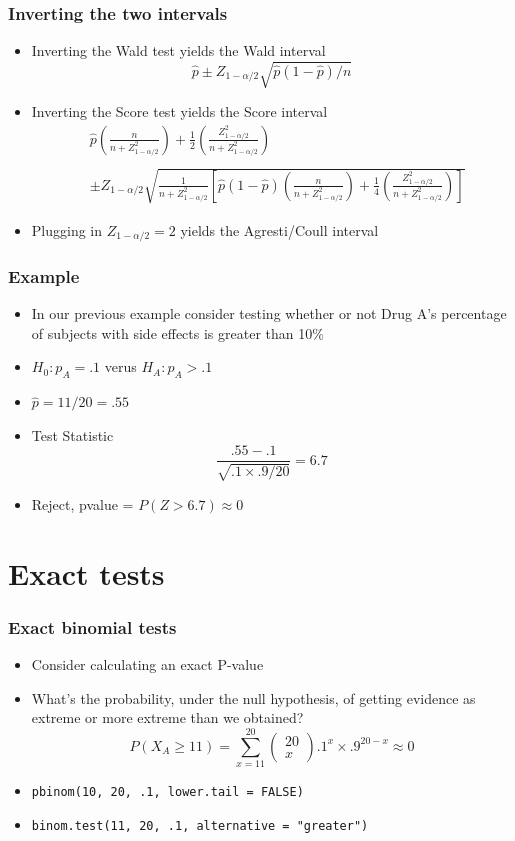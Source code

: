 \documentclass[aspectratio=169]{beamer}
\begin{document}
\begin{frame}\frametitle{Inverting the two intervals}
  \begin{itemize}
  \item Inverting the Wald test yields the Wald interval
    $$
    \hat p \pm Z_{1 - \alpha / 2} \sqrt{\hat p(1 - \hat p) / n}
    $$
  \item Inverting the Score test yields the Score interval
    \small
    \begin{eqnarray*}
      &  \hat p \left(\frac{n}{n + Z_{1 - \alpha / 2}^2}\right) + 
      \frac{1}{2} \left(\frac{Z_{1 - \alpha / 2}^2}{n + Z_{1 - \alpha / 2}^2}\right) \\\\ 
      &  \pm Z_{1 - \alpha/2}\sqrt{\frac{1}{n + Z_{1 - \alpha / 2}^2} 
        \left[\hat p (1 - \hat p) \left(\frac{n}{n + Z_{1 - \alpha / 2}^2}\right) +
          \frac{1}{4} \left(\frac{Z_{1 - \alpha / 2}^2}{n + Z_{1 - \alpha / 2}^2}\right)
        \right]}
    \end{eqnarray*}
    \normalsize
  \item Plugging in $Z_{1-\alpha / 2} = 2$ yields the Agresti/Coull interval
  \end{itemize}
\end{frame}

\begin{frame}\frametitle{Example}
  \begin{itemize}
  \item In our previous example consider testing whether or not Drug A's
    percentage of subjects with side effects is greater than 10\%
  \item $H_0 : p_A = .1$ verus $H_A : p_A > .1$ 
  \item $\hat p = 11 / 20 = .55$
  \item Test Statistic $$\frac{.55 - .1}{\sqrt{.1 \times .9 / 20}} = 6.7$$
  \item Reject, pvalue = $P(Z > 6.7) \approx 0$
  \end{itemize}
\end{frame}

\section{Exact tests}
\begin{frame}\frametitle{Exact binomial tests} 
  \begin{itemize}
  \item Consider calculating an exact P-value
  \item What's the probability, under the null hypothesis, of getting
    evidence as extreme or more extreme than we obtained?
    $$P(X_A \geq 11) = 
    \sum_{x=11}^{20}\left(\begin{array}{c}20 \\ x \end{array}\right) .1^x\times .9^{20-x}
    \approx 0
    $$
  \item \texttt{pbinom(10, 20, .1, lower.tail = FALSE)}
  \item \texttt{binom.test(11, 20, .1, alternative = "greater")}
  \end{itemize}
\end{frame}
\end{document}
